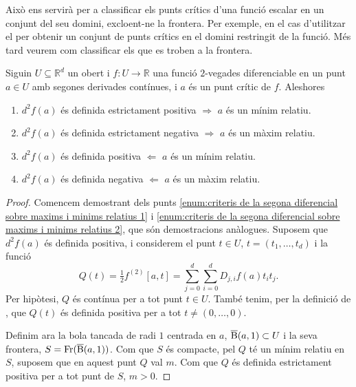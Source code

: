 \documentclass[../Apunts.tex]{subfiles}
\begin{document}
	Això ens servirà per a classificar els punts crítics d'una funció escalar en un conjunt del seu domini, excloent-ne la frontera. Per exemple, en el cas d'utilitzar el  per obtenir un conjunt de punts crítics en el domini restringit de la funció. Més tard veurem com classificar els que es troben a la frontera.
	\begin{proposition}\label{prop:criteris de la segona diferencial sobre maxims i minims relatius}
		Siguin \(U\subseteq\mathbb{R}^{d}\) un obert i \(f\colon U\to\mathbb{R}\) una funció \(2\)-vegades diferenciable en un punt \(a\in U\) amb segones derivades contínues, i \(a\) és un punt crític de \(f\). Aleshores
		\begin{enumerate}
			\item\label{enum:criteris de la segona diferencial sobre maxims i minims relatius 1} \(d^{2}f(a)\) és definida estrictament positiva \(\Rightarrow\)  \(a\) és un mínim relatiu.
			\item\label{enum:criteris de la segona diferencial sobre maxims i minims relatius 2} \(d^{2}f(a)\) és definida estrictament negativa \(\Rightarrow\)  \(a\) és un màxim relatiu.
			\item\label{enum:criteris de la segona diferencial sobre maxims i minims relatius 3} \(d^{2}f(a)\) és definida positiva \(\Leftarrow\)  \(a\) és un mínim relatiu.
			\item\label{enum:criteris de la segona diferencial sobre maxims i minims relatius 4} \(d^{2}f(a)\) és definida negativa \(\Leftarrow\)  \(a\) és un màxim relatiu.
		\end{enumerate}
		\begin{proof}
			Comencem demostrant dels punts \eqref{enum:criteris de la segona diferencial sobre maxims i minims relatius 1} i \eqref{enum:criteris de la segona diferencial sobre maxims i minims relatius 2}, que són demostracions anàlogues. Suposem que \(d^{2}f(a)\) és definida positiva, i considerem el punt \(t\in U\), \(t=(t_{1},\dots,t_{d})\) i la funció
			\[Q(t)=\tfrac{1}{2}f^{(2)}[a,t]=\sum_{j=0}^{d}\sum_{i=0}^{d}D_{j,i}f(a)t_{i}t_{j}.\]
			Per hipòtesi, \(Q\) és contínua per a tot punt \(t\in U\). També tenim, per la definició de , que \(Q(t)\) és definida positiva per a tot \(t\neq(0,\dots,0)\).
			
			Definim ara la bola tancada de radi \(1\) centrada en \(a\), \(\overline{\operatorname{B}}(a,1)\subset U\) i la seva frontera, \(S=\operatorname{Fr}(\overline{\operatorname{B}}(a,1))\). Com que \(S\) és compacte, pel   \(Q\) té un mínim relatiu en \(S\), suposem que en aquest punt \(Q\) val \(m\). Com que \(Q\) és definida estrictament positiva per a tot punt de \(S\), \(m>0\).
			

\end{proof}
\end{proposition}
\end{document}
